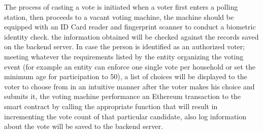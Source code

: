 The process of casting a vote is initiated when a voter first enters a polling station, then proceeds to a vacant voting machine, the machine should be equipped with an ID Card reader and fingerprint scanner to conduct a biometric identity check. the information obtained will be checked against the records saved on the backend server. In case the person is identified as an authorized voter; meeting whatever the requirements listed by the entity organizing the voting event (for example an entity can enforce one single vote per household or set the minimum age for participation to 50), a list of choices will be displayed to the voter to choose from in an intuitive manner after the voter makes his choice and submits it, the voting machine performance an Ethereum transaction to the smart contract by calling the appropriate function that will result in incrementing the vote count of that particular candidate, also log information about the vote will be saved to the backend server.
